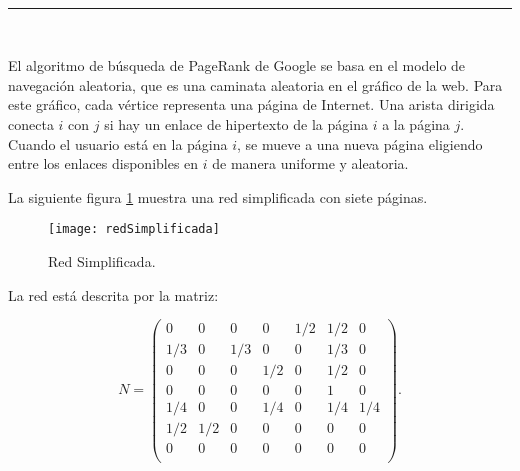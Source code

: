\begin{center}
	{\fboxrule=4pt } \\
	\rule{15cm}{0pt} \\
\end{center}

\begin{ejer}
    \par El algoritmo de búsqueda de PageRank de Google se basa en el modelo de navegación aleatoria, que es una caminata aleatoria en el gráfico de la web. 
    Para este gráfico, cada vértice representa una página de Internet. Una arista dirigida conecta $i$ con $j$ si hay un enlace de hipertexto de la página $i$ a la página $j$. 
    Cuando el usuario está en la página $i$, se mueve a una nueva página eligiendo entre los enlaces disponibles en $i$ de manera uniforme y aleatoria.
    \par La siguiente figura \ref{fig:redSimplificada} muestra una red simplificada con siete páginas.
\end{ejer}

\begin{figure}[H]
	\texttt{[image: redSimplificada]}
	\centering
	\caption{Red Simplificada.}
    \label{fig:redSimplificada}
\end{figure}
\begin{ejer}
    \par La red está descrita por la matriz:
\end{ejer}
\begin{equation}
    N =
    \begin{pmatrix}
    0 & 0 & 0 & 0 & 1/2 & 1/2 & 0\\
    1/3 & 0 & 1/3 & 0 & 0 & 1/3 & 0\\
    0 & 0 & 0 & 1/2 & 0 & 1/2 & 0\\
    0 & 0 & 0 & 0 & 0 & 1 & 0 \\
    1/4 & 0 & 0 & 1/4 & 0 & 1/4 & 1/4 \\
    1/2 & 1/2 & 0 & 0 & 0 & 0 & 0 \\
    0 & 0 & 0 & 0 & 0 & 0 & 0 \\
    \end{pmatrix}
    .
\end{equation}

